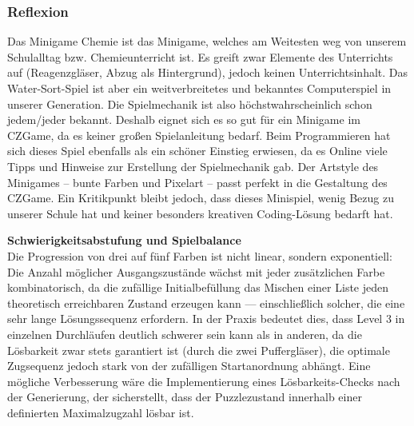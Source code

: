 \subsubsection{Reflexion}
Das Minigame Chemie ist das Minigame, welches am Weitesten weg von unserem Schulalltag bzw. Chemieunterricht ist. Es greift zwar Elemente des Unterrichts auf (Reagenzgläser, Abzug als Hintergrund), jedoch keinen Unterrichtsinhalt. Das Water-Sort-Spiel ist aber ein weitverbreitetes und bekanntes Computerspiel in unserer Generation.
Die Spielmechanik ist also höchstwahrscheinlich schon jedem/jeder bekannt.
Deshalb eignet sich es so gut für ein Minigame im CZGame, da es keiner großen Spielanleitung bedarf. Beim Programmieren hat sich dieses Spiel ebenfalls als ein schöner Einstieg erwiesen, da es Online viele Tipps und Hinweise zur Erstellung der Spielmechanik gab.
Der Artstyle des Minigames – bunte Farben und Pixelart – passt perfekt in die Gestaltung des CZGame.
Ein Kritikpunkt bleibt jedoch, dass dieses Minispiel, wenig Bezug zu unserer Schule hat und keiner besonders kreativen Coding-Lösung bedarft hat.

\textbf{Schwierigkeitsabstufung und Spielbalance} \\
Die Progression von drei auf fünf Farben ist nicht linear, sondern exponentiell: Die Anzahl möglicher Ausgangszustände wächst mit jeder zusätzlichen Farbe kombinatorisch, da die zufällige Initialbefüllung das Mischen einer Liste jeden theoretisch erreichbaren Zustand erzeugen kann — einschließlich solcher, die eine sehr lange Lösungssequenz erfordern.
In der Praxis bedeutet dies, dass Level 3 in einzelnen Durchläufen deutlich schwerer sein kann als in anderen, da die Lösbarkeit zwar stets garantiert ist (durch die zwei Puffergläser), die optimale Zugsequenz jedoch stark von der zufälligen Startanordnung abhängt.
Eine mögliche Verbesserung wäre die Implementierung eines Lösbarkeits-Checks nach der Generierung, der sicherstellt, dass der Puzzlezustand innerhalb einer definierten Maximalzugzahl lösbar ist.

